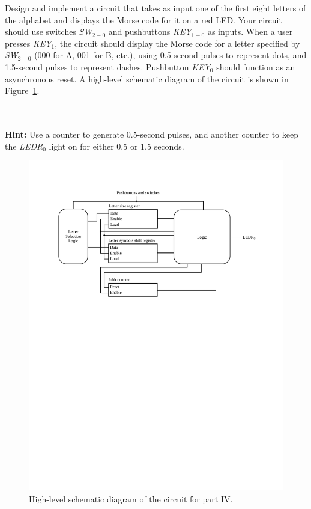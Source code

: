 \documentclass[epsfig,10pt,fullpage]{article}
\newcommand{\CommonDocsPath}{../../../common/docs}
\begin{document}
Design and implement a circuit that takes as input one of the first eight letters of the
alphabet and displays the Morse code for it on a red LED. Your circuit should use 
switches {\it SW}$_{2-0}$ and pushbuttons {\it KEY}$_{1-0}$ as inputs. When a user 
presses {\it KEY}$_1$, the circuit should display the Morse code for a letter specified 
by {\it SW}$_{2-0}$ (000 for A, 001 for B, etc.), using 0.5-second pulses to represent dots, 
and 1.5-second pulses to represent dashes. Pushbutton {\it KEY}$_0$ should function as 
an asynchronous reset. A high-level schematic diagram of the circuit is shown in 
Figure~\ref{fig:morse_code_cct}.

~\\
~\\
{\bf Hint:} Use a counter to generate 0.5-second pulses, and another counter to keep 
the {\it LEDR}$_0$ light on for either 0.5 or 1.5 seconds.

\begin{figure}
\begin{center}
	\includegraphics[scale = 0.9]{figures/fig_morse_code_circuit_schematic.pdf}
\end{center}
\caption{High-level schematic diagram of the circuit for part IV.}
\label{fig:morse_code_cct}
\end{figure}



\end{document}
